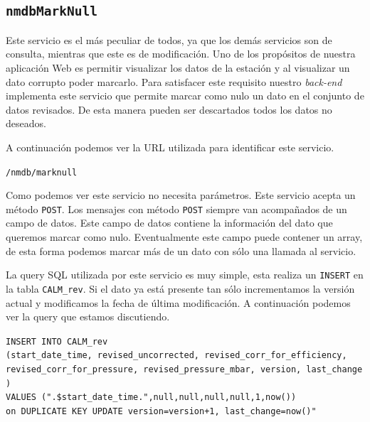 {	\subsection{\texttt{nmdbMarkNull}}
		Este servicio es el más peculiar de todos, ya que los demás servicios son de consulta, mientras que este es de modificación. Uno de
		los propósitos de nuestra aplicación Web es permitir visualizar los datos de la estación y al visualizar un dato corrupto poder
		marcarlo.  Para satisfacer este requisito nuestro \emph{back-end} implementa este servicio que permite marcar como nulo un dato en el
		conjunto de datos revisados. De esta manera pueden ser descartados todos los datos no deseados.
		\par
		A continuación podemos ver la URL utilizada para identificar este servicio.
			\begin{center} \texttt{/nmdb/marknull}  \end{center}
		Como podemos ver este servicio no necesita parámetros. Este servicio acepta un método \texttt{POST}. Los mensajes con método
		\texttt{POST} siempre van acompañados de un campo de datos. Este campo de datos contiene la información del dato que queremos marcar
		como nulo. Eventualmente este campo puede contener un array, de esta forma podemos marcar más de un dato con sólo una llamada al
		servicio.
		\par 
		La query SQL utilizada por este servicio es muy simple, esta realiza un \texttt{INSERT} en la tabla \texttt{CALM\_rev}. Si el dato ya
		está presente tan sólo incrementamos la versión actual y modificamos la fecha de última modificación. A continuación podemos ver la
		query que estamos discutiendo.
			\begin{center} \texttt{\textquotedbl INSERT INTO CALM\_rev 
			  		\\	(start\_date\_time, revised\_uncorrected, revised\_corr\_for\_efficiency, revised\_corr\_for\_pressure, revised\_pressure\_mbar, version, last\_change )
				      	\\	VALUES (\cc".\$start\_date\_time."\cc,null,null,null,null,1,now()) 
				      	\\	on DUPLICATE KEY UPDATE version=version+1, last\_change=now()"}
			\end{center} 
}
